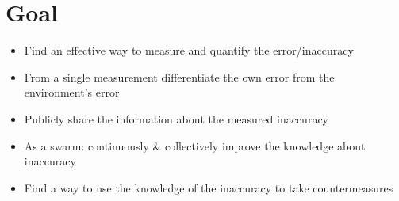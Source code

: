 \section{Goal}
\begin{itemize}
	\item{Find an effective way to measure and quantify the error/inaccuracy}
	\item{From a single measurement differentiate the own error from the environment's error}
	\item{Publicly share the information about the measured inaccuracy}
	\item{As a swarm: continuously \& collectively improve the knowledge about inaccuracy}
	\item{Find a way to use the knowledge of the inaccuracy to take countermeasures}
\end{itemize}